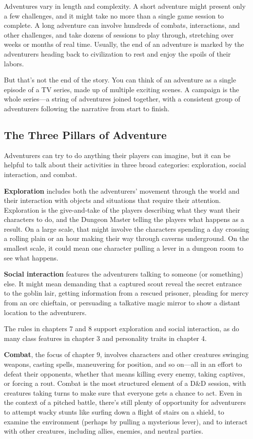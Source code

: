 Adventures vary in length and complexity. A short adventure might present only a few challenges, and it might take no more than a single game session to complete. A long adventure can involve hundreds of combats, interactions, and other challenges, and take dozens of sessions to play through, stretching over weeks or months of real time. Usually, the end of an adventure is marked by the adventurers heading back to civilization to rest and enjoy the spoils of their labors.

But that’s not the end of the story. You can think of an adventure as a single episode of a TV series, made up of multiple exciting scenes. A campaign is the whole series—a string of adventures joined together, with a consistent group of adventurers following the narrative from start to finish.

\subsection{The Three Pillars of Adventure}
Adventurers can try to do anything their players can imagine, but it can be helpful to talk about their activities in three broad categories: exploration, social interaction, and combat.

\textbf{Exploration} includes both the adventurers’ movement through the world and their interaction with objects and situations that require their attention. Exploration is the give-and-take of the players describing what they want their characters to do, and the Dungeon Master telling the players what happens as a result. On a large scale, that might involve the characters spending a day crossing a rolling plain or an hour making their way through caverns underground. On the smallest scale, it could mean one character pulling a lever in a dungeon room to see what happens.

\textbf{Social interaction} features the adventurers talking to someone (or something) else. It might mean demanding that a captured scout reveal the secret entrance to the goblin lair, getting information from a rescued prisoner, pleading for mercy from an orc chieftain, or persuading a talkative magic mirror to show a distant location to the adventurers.

The rules in chapters 7 and 8 support exploration and social interaction, as do many class features in chapter 3 and personality traits in chapter 4.

\textbf{Combat}, the focus of chapter 9, involves characters and other creatures swinging weapons, casting spells, maneuvering for position, and so on—all in an effort to defeat their opponents, whether that means killing every enemy, taking captives, or forcing a rout. Combat is the most structured element of a D\&D session, with creatures taking turns to make sure that everyone gets a chance to act. Even in the context of a pitched battle, there’s still plenty of opportunity for adventurers to attempt wacky stunts like surfing down a flight of stairs on a shield, to examine the environment (perhaps by pulling a mysterious lever), and to interact with other creatures, including allies, enemies, and neutral parties.

